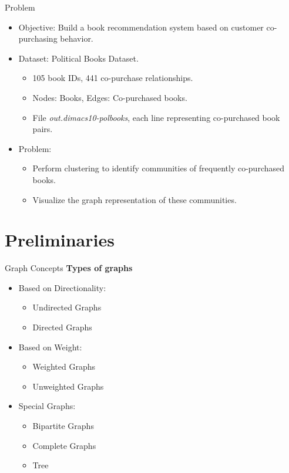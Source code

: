 \documentclass[compress]{beamer}
\begin{document}
\begin{frame}[t]{Problem}
    \begin{itemize}
        \item Objective: Build a book recommendation system based on customer co-purchasing behavior.
        \item Dataset: Political Books Dataset.
        \begin{itemize}
            \item 105 book IDs, 441 co-purchase relationships.
            \item Nodes: Books, Edges: Co-purchased books.
            \item File \textit{out.dimacs10-polbooks}, each line representing co-purchased book pairs.
        \end{itemize}
        \item Problem:
        \begin{itemize}
            \item Perform clustering to identify communities of frequently co-purchased books.
            \item Visualize the graph representation of these communities.
        \end{itemize}
    \end{itemize}
\end{frame}

\section{Preliminaries}

\begin{frame}[t]{Graph Concepts}
    \textbf{Types of graphs}

    \begin{itemize}
        \item Based on Directionality:
        \begin{itemize}
            \item Undirected Graphs
            \item Directed Graphs
        \end{itemize}

        \item Based on Weight:
        \begin{itemize}
            \item Weighted Graphs
            \item Unweighted Graphs
        \end{itemize}
        
        \item Special Graphs:
        \begin{itemize}
            \item Bipartite Graphs
            \item Complete Graphs
            \item Tree
        \end{itemize}

    \end{itemize}
\end{frame}
\end{document}
